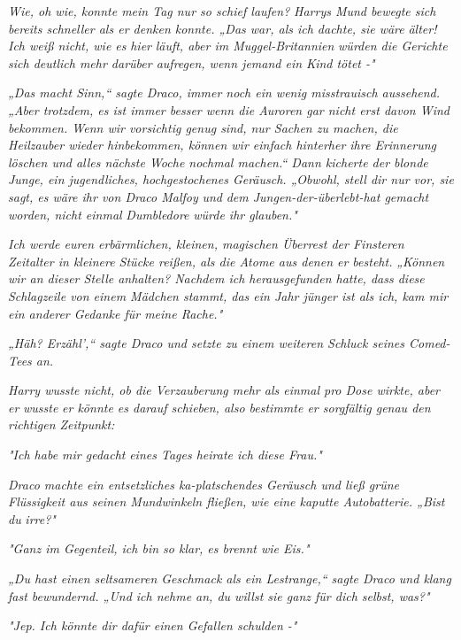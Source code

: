 {\emph{\emph{Wie, oh wie, konnte mein Tag nur so schief laufen?}} \emph{Harrys Mund bewegte sich bereits schneller als er denken konnte. „Das war, als ich dachte, sie wäre} \emph{\emph{älter!}} \emph{Ich weiß nicht, wie es} \emph{\emph{hier}} \emph{läuft, aber im Muggel-Britannien} \emph{würden die Gerichte sich deutlich mehr darüber aufregen, wenn jemand ein Kind tötet -"}

\emph{„Das macht Sinn,“ sagte Draco, immer noch ein wenig misstrauisch aussehend. „Aber trotzdem, es ist immer besser wenn die Auroren gar nicht erst davon Wind bekommen. Wenn wir vorsichtig genug sind, nur Sachen zu machen, die Heilzauber wieder hinbekommen, können wir einfach hinterher ihre Erinnerung löschen und alles nächste Woche nochmal machen.“ Dann kicherte der blonde Junge, ein jugendliches, hochgestochenes Geräusch. „Obwohl, stell dir nur vor, sie sagt, es wäre ihr von Draco Malfoy} \emph{\emph{und}} \emph{dem Jungen-der-überlebt-hat gemacht worden, nicht einmal} \emph{\emph{Dumbledore}} \emph{würde ihr glauben."}

\emph{\emph{Ich werde euren erbärmlichen, kleinen, magischen Überrest der Finsteren Zeitalter in kleinere Stücke reißen, als die Atome aus denen er besteht.}} \emph{„Können wir an dieser Stelle anhalten? Nachdem ich herausgefunden hatte, dass diese Schlagzeile von einem Mädchen stammt, das ein Jahr jünger ist als ich, kam mir ein anderer Gedanke für meine Rache."}

\emph{„Häh? Erzähl',“ sagte Draco und setzte zu einem weiteren Schluck seines Comed-Tees an.}

\emph{Harry wusste nicht, ob die Verzauberung mehr als einmal pro Dose wirkte, aber er} \emph{\emph{wusste}} \emph{er könnte es darauf schieben, also bestimmte er sorgfältig genau den richtigen Zeitpunkt:}

\emph{"Ich habe mir gedacht} \emph{\emph{eines Tages heirate ich diese Frau.}"}

\emph{Draco machte ein entsetzliches ka-platschendes Geräusch und ließ grüne Flüssigkeit aus seinen Mundwinkeln fließen, wie eine kaputte Autobatterie. „Bist du} \emph{\emph{irre?}"}

\emph{"Ganz im Gegenteil, ich bin so klar, es brennt wie Eis."}

\emph{„Du hast einen seltsameren Geschmack als ein Lestrange,“ sagte Draco und klang fast bewundernd. „Und ich nehme an, du willst sie ganz für dich selbst, was?"}

\emph{"Jep. Ich könnte dir dafür einen Gefallen schulden -"}

}
